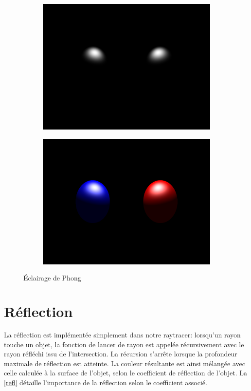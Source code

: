 \documentclass{article}
\begin{document}
\begin{figure}[hb]
  \begin{subfigure}{0.45\textwidth}
    \includegraphics[width=1\textwidth]{images/phong3.png}
  \end{subfigure}
  \begin{subfigure}{0.45\textwidth}
    \includegraphics[width=1\textwidth]{images/phong4.png}
  \end{subfigure}
  \caption{Éclairage de Phong\label{phong}}
\end{figure}


\section{Réflection}
La réflection est implémentée simplement dans notre raytracer: lorsqu'un rayon
touche un objet, la fonction de lancer de rayon est appelée récursivement avec
le rayon réfléchi issu de l'intersection. La récursion s'arrête lorsque la
profondeur maximale de réflection est atteinte. La couleur résultante est ainsi
mélangée avec celle calculée à la surface de l'objet, selon le coefficient de
réflection de l'objet. La \cref{refl} détaille l'importance de la
réflection selon le coefficient associé.
\end{document}
